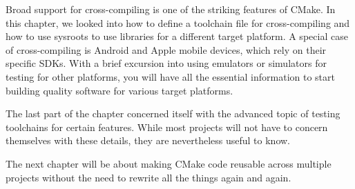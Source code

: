 Broad support for cross-compiling is one of the striking features of CMake. In this chapter, we looked into how to define a toolchain file for cross-compiling and how to use sysroots to use libraries for a different target platform. A special case of cross-compiling is Android and Apple mobile devices, which rely on their specific SDKs. With a brief excursion into using emulators or simulators for testing for other platforms, you will have all the essential information to start building quality software for various target platforms.

The last part of the chapter concerned itself with the advanced topic of testing toolchains for certain features. While most projects will not have to concern themselves with these details, they are nevertheless useful to know.

The next chapter will be about making CMake code reusable across multiple projects without the need to rewrite all the things again and again.
